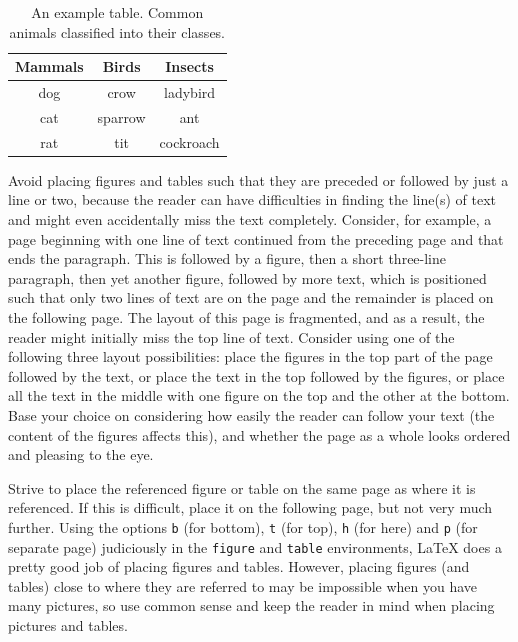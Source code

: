 \documentclass[english, 12pt, a4paper, elec, utf8, a-2b, online]{aaltothesis}
\begin{document}
\begin{table}[tb]
	\centering
	\caption{An example table. Common animals classified into their classes.}
	\label{tab:animals}
	\sffamily%
	\begin{tabular}{ccc}
	  \hline
	  \textbf{Mammals} & \textbf{Birds} & \textbf{Insects}\\ \hline
	  dog & crow & ladybird \\ \hline
	  cat & sparrow & ant \\ \hline
	  rat & tit & cockroach \\ \hline
	\end{tabular}
\end{table}

Avoid placing figures and tables such that they are preceded or followed by just
a line or two, because the reader can have difficulties in finding the line(s) 
of text and might even accidentally miss the text completely. Consider, for 
example, a page beginning with one line of text continued from the preceding 
page and that ends the paragraph. This is followed by a figure, then a short 
three-line paragraph, then yet another figure, followed by more text, which is 
positioned such that only two lines of text are on the page and the remainder is
placed on the following page. The layout of this page is fragmented, and as a 
result, the reader might initially miss the top line of text. Consider using one
of the following three layout possibilities: place the figures in the top part 
of the page followed by the text, or place the text in the top followed by the 
figures, or place all the text in the middle with one figure on the top and the 
other at the bottom. Base your choice on considering how easily the reader can 
follow your text (the content of the figures affects this), and whether the page
as a whole looks ordered and pleasing to the eye.

Strive to place the referenced figure or table on the same page as where it is 
referenced. If this is difficult, place it on the following page, but not very 
much further. Using the options \texttt{b} (for bottom), \texttt{t} (for top), 
\texttt{h} (for here) and \texttt{p} (for separate page) judiciously in the 
\texttt{figure} and \texttt{table} environments, \LaTeX{} does a pretty good 
job of placing figures and tables. However, placing figures (and tables) close 
to where they are referred to may be impossible when you have many pictures, so 
use common sense and keep the reader in mind when placing pictures and tables.
\end{document}
